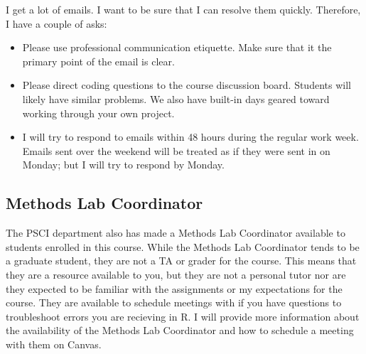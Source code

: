 \documentclass[11pt, a4paper]{article}
\begin{document}
I get a lot of emails. I want to be sure that I can resolve them quickly. Therefore, I have a couple of asks:
\begin{itemize}
    \item Please use professional communication etiquette. Make sure that it the primary point of the email is clear. 
    \item Please direct coding questions to the course discussion board. Students will likely have similar problems. We also have built-in days geared toward working through your own project. 
    \item I will try to respond to emails within 48 hours during the regular work week. Emails sent over the weekend will be treated as if they were sent in on Monday; but I will try to respond by Monday.
\end{itemize}

\subsection*{Methods Lab Coordinator}

The PSCI department also has made a Methods Lab Coordinator available to students enrolled in this course. While the Methods Lab Coordinator tends to be a graduate student, they are not a TA or grader for the course. This means that they are a resource available to you, but they are not a personal tutor nor are they expected to be familiar with the assignments or my expectations for the course. They are available to schedule meetings with if you have questions to troubleshoot errors you are recieving in R. I will provide more information about the availability of the Methods Lab Coordinator and how to schedule a meeting with them on Canvas.
\end{document}
